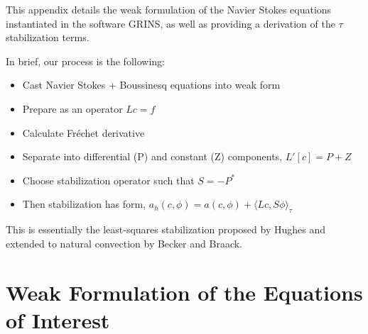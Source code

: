 \label{app:stab}

This appendix details the weak formulation of the Navier Stokes
equations instantiated in the software GRINS, as well as providing a
derivation of the $\tau$ stabilization terms. 

In brief, our process is the following: 

\begin{itemize}
 \item Cast Navier Stokes + Boussinesq equations into weak form
 \item Prepare as an operator $Lc=f$
 \item Calculate Fr\'echet derivative
 \item Separate into differential (P) and constant (Z) components,
       $L'[c] = P + Z$
 \item Choose stabilization operator such that $S = -P^*$
 \item Then stabilization has form, $a_h(c,\phi) = a(c,\phi) + \langle
       Lc,S\phi \rangle_\tau$
\end{itemize}

This is essentially the least-squares stabilization proposed by Hughes
and extended to natural convection by Becker and Braack. 

%
%

\section{Weak Formulation of the Equations of Interest}

